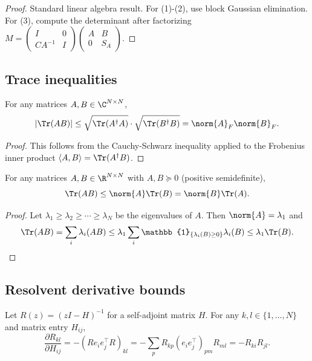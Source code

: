 \begin{proof}
Standard linear algebra result. For (1)-(2), use block Gaussian elimination. For (3), compute the determinant after factorizing $M = \begin{pmatrix} I & 0 \\ CA^{-1} & I \end{pmatrix} \begin{pmatrix} A & B \\ 0 & S_A \end{pmatrix}$.
\end{proof}

\subsection{Trace inequalities}

\begin{lemma}\label{lem:trace-cs}
For any matrices $A, B \in \C^{N \times N}$,
\[
|\Tr(AB)| \leq \sqrt{\Tr(A^\dagger A)} \cdot \sqrt{\Tr(B^\dagger B)} = \norm{A}_F \norm{B}_F.
\]
\end{lemma}

\begin{proof}
This follows from the Cauchy-Schwarz inequality applied to the Frobenius inner product $\langle A, B \rangle = \Tr(A^\dagger B)$.
\end{proof}

\begin{lemma}\label{lem:trace-submult}
For any matrices $A, B \in \R^{N \times N}$ with $A, B \succeq 0$ (positive semidefinite),
\[
\Tr(AB) \leq \norm{A} \Tr(B) = \norm{B} \Tr(A).
\]
\end{lemma}

\begin{proof}
Let $\lambda_1 \geq \lambda_2 \geq \cdots \geq \lambda_N$ be the eigenvalues of $A$. Then $\norm{A} = \lambda_1$ and
\[
\Tr(AB) = \sum_i \lambda_i(AB) \leq \lambda_1 \sum_i \mathbb{1}_{\{\lambda_i(B) \geq 0\}} \lambda_i(B) \leq \lambda_1 \Tr(B).
\]
\end{proof}

\subsection{Resolvent derivative bounds}

\begin{lemma}\label{lem:resolvent-derivative}
Let $R(z) = (zI - H)^{-1}$ for a self-adjoint matrix $H$. For any $k, l \in \{1, \ldots, N\}$ and matrix entry $H_{ij}$,
\[
\frac{\partial R_{kl}}{\partial H_{ij}} = -(R e_i e_j^\top R)_{kl} = -\sum_p R_{kp} (e_i e_j^\top)_{pm} R_{ml} = -R_{ki} R_{jl}.
\]
\end{lemma}

